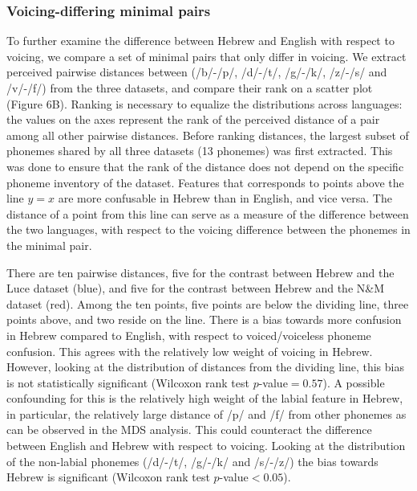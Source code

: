 \subsubsection{Voicing-differing minimal pairs} To further examine the difference between Hebrew and English with respect to voicing, we compare a set of minimal pairs that only differ in voicing. We extract perceived pairwise distances between (/b/-/p/, /d/-/t/, /g/-/k/, /z/-/s/ and /v/-/f/) from the three datasets, and compare their rank on a scatter plot (Figure 6B). Ranking is necessary to equalize the distributions across languages: the values on the axes represent the rank of the perceived distance of a pair among all other pairwise distances. Before ranking distances, the largest subset of phonemes shared by all three datasets (13 phonemes) was first extracted. This was done to ensure that the rank of the distance does not depend on the specific phoneme inventory of the dataset. Features that corresponds to points above the line $y=x$ are more confusable in Hebrew than in English, and vice versa. The distance of a point from this line can serve as a measure of the difference between the two languages, with respect to the voicing difference between the phonemes in the minimal pair.

There are ten pairwise distances, five for the contrast between Hebrew and the Luce dataset (blue), and five for the contrast between Hebrew and the N\&M dataset (red). Among the ten points, five points are below the dividing line, three points above, and two reside on the line. There is a bias towards more confusion in Hebrew compared to English, with respect to voiced/voiceless phoneme confusion. This agrees with the relatively low weight of voicing in Hebrew. However, looking at the distribution of distances from the dividing line, this bias is not statistically significant (Wilcoxon rank test $p$-value$=0.57$). A possible confounding for this is the relatively high weight of the labial feature in Hebrew, in particular, the relatively large distance of /p/ and /f/ from other phonemes as can be observed in the MDS analysis. This could counteract the difference between English and Hebrew with respect to voicing. Looking at the distribution of the non-labial phonemes (/d/-/t/, /g/-/k/ and /s/-/z/) the bias towards Hebrew is significant (Wilcoxon rank test $p$-value$<0.05$).

